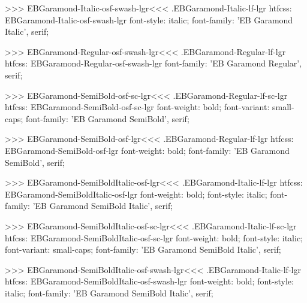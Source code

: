 >>>
\<EBGaramond-Italic-osf-swash-lgr\><<<
.EBGaramond-Italic-lf-lgr
htfcss:  EBGaramond-Italic-osf-swash-lgr  font-style: italic; font-family: 'EB Garamond Italic', serif;

>>>
\<EBGaramond-Regular-osf-swash-lgr\><<<
.EBGaramond-Regular-lf-lgr
htfcss:  EBGaramond-Regular-osf-swash-lgr  font-family: 'EB Garamond Regular', serif;

>>>
\<EBGaramond-SemiBold-osf-sc-lgr\><<<
.EBGaramond-Regular-lf-sc-lgr
htfcss:  EBGaramond-SemiBold-osf-sc-lgr  font-weight: bold; font-variant: small-caps; font-family: 'EB Garamond SemiBold', serif;

>>>
\<EBGaramond-SemiBold-osf-lgr\><<<
.EBGaramond-Regular-lf-lgr
htfcss:  EBGaramond-SemiBold-osf-lgr  font-weight: bold; font-family: 'EB Garamond SemiBold', serif;

>>>
\<EBGaramond-SemiBoldItalic-osf-lgr\><<<
.EBGaramond-Italic-lf-lgr
htfcss:  EBGaramond-SemiBoldItalic-osf-lgr  font-weight: bold; font-style: italic; font-family: 'EB Garamond SemiBold Italic', serif;

>>>
\<EBGaramond-SemiBoldItalic-osf-sc-lgr\><<<
.EBGaramond-Italic-lf-sc-lgr
htfcss:  EBGaramond-SemiBoldItalic-osf-sc-lgr  font-weight: bold; font-style: italic; font-variant: small-caps; font-family: 'EB Garamond SemiBold Italic', serif;

>>>
\<EBGaramond-SemiBoldItalic-osf-swash-lgr\><<<
.EBGaramond-Italic-lf-lgr
htfcss:  EBGaramond-SemiBoldItalic-osf-swash-lgr  font-weight: bold; font-style: italic; font-family: 'EB Garamond SemiBold Italic', serif;

